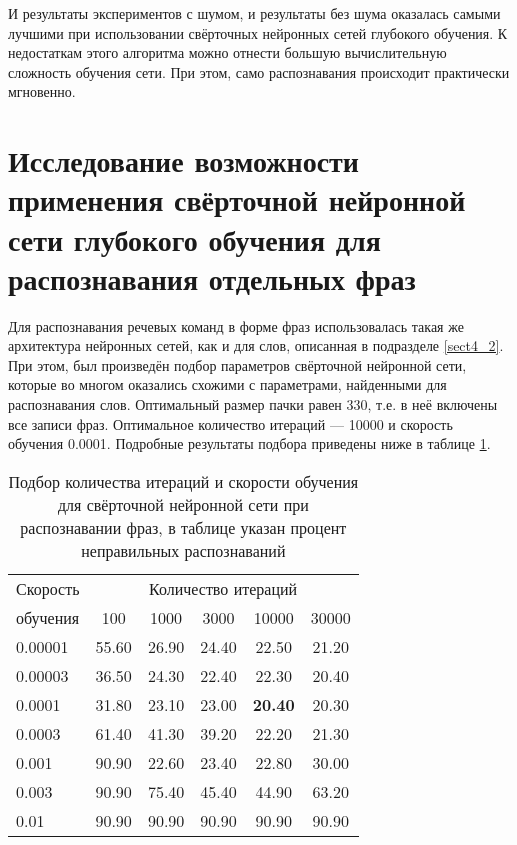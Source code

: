 И результаты экспериментов с шумом, и результаты без шума оказалась самыми лучшими при использовании свёрточных нейронных сетей глубокого обучения.
К недостаткам этого алгоритма можно отнести большую вычислительную сложность обучения сети.
При этом, само распознавания происходит практически мгновенно.

\clearpage


\section{Исследование возможности применения свёрточной нейронной сети глубокого обучения для распознавания отдельных фраз} \label{sect4_5}

Для распознавания речевых команд в форме фраз использовалась такая же архитектура нейронных сетей, как и для слов, описанная в подразделе \ref{sect4_2}.
При этом, был произведён подбор параметров свёрточной нейронной сети, которые во многом оказались схожими с параметрами, найденными для распознавания слов.
Оптимальный размер пачки равен 330, т.е. в неё включены все записи фраз.
Оптимальное количество итераций --- 10000 и скорость обучения 0.0001.
Подробные результаты подбора приведены ниже в таблице \ref{tab:cnn_phrases_bf_iter_pace}.

\begin{table}[h]
	\centering
	\caption{Подбор количества итераций и скорости обучения для свёрточной нейронной сети при распознавании фраз, в таблице указан процент неправильных распознаваний}
	\label{tab:cnn_phrases_bf_iter_pace}
	\begin{tabular}{| l | c | c | c | c | c |}
		\hline
		Скорость & \multicolumn{5}{c|}{Количество итераций} \\
		\hhline{~-----}
		обучения \phantom{00} & \phantom{000} 100 \phantom{000} & \phantom{000}1000\phantom{000} & \phantom{000}3000\phantom{000} & \phantom{00} 10000 \phantom{00} & \phantom{00} 30000 \phantom{00} \\
		\hline
		0.00001	& 55.60 & 26.90 & 24.40 & 22.50 & 21.20 \\
		0.00003	& 36.50 & 24.30 & 22.40 & 22.30 & 20.40 \\
		0.0001	& 31.80 & 23.10 & 23.00 & \textbf{20.40} & 20.30 \\
		0.0003	& 61.40 & 41.30 & 39.20 & 22.20 & 21.30 \\
		0.001	& 90.90 & 22.60 & 23.40 & 22.80 & 30.00 \\
		0.003	& 90.90 & 75.40 & 45.40 & 44.90 & 63.20 \\
		0.01	& 90.90 & 90.90 & 90.90 & 90.90 & 90.90 \\
		\hline
	\end{tabular}
\end{table}

